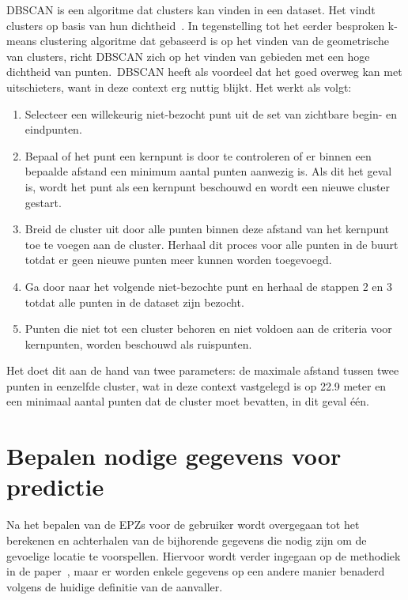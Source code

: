 \ac{DBSCAN} is een algoritme dat clusters kan vinden in een dataset. Het vindt
clusters op basis van hun dichtheid~\cite{KMeansvs80:online}. In tegenstelling tot het eerder besproken
k-means clustering algoritme dat gebaseerd is
op het vinden van de geometrische van clusters, richt \ac{DBSCAN}
zich op het vinden van gebieden met een hoge dichtheid van punten.\ \ac{DBSCAN}
heeft als voordeel dat het goed overweg kan met uitschieters, want in deze
context erg nuttig blijkt. Het werkt als volgt:
\begin{enumerate}
    \item Selecteer een willekeurig niet-bezocht punt uit de set van zichtbare begin- en
          eindpunten.
    \item Bepaal of het punt een kernpunt is door te controleren of er binnen een
          bepaalde afstand een minimum aantal punten aanwezig is. Als dit het geval is,
          wordt het punt als een kernpunt beschouwd en wordt een nieuwe cluster gestart.
    \item Breid de cluster uit door alle punten binnen deze afstand van het kernpunt toe
          te voegen aan de cluster. Herhaal dit proces voor alle punten in de buurt
          totdat er geen nieuwe punten meer kunnen worden toegevoegd.
    \item Ga door naar het volgende niet-bezochte punt en herhaal de stappen 2 en 3
          totdat alle punten in de dataset zijn bezocht.
    \item Punten die niet tot een cluster behoren en niet voldoen aan de criteria voor
          kernpunten, worden beschouwd als ruispunten.
\end{enumerate}
Het doet dit aan de hand van twee parameters: de maximale afstand tussen twee
punten in eenzelfde cluster, wat in deze context vastgelegd is op 22.9 meter en
een minimaal aantal punten dat de cluster moet bevatten, in dit geval één.

\section{Bepalen nodige gegevens voor predictie}
Na het bepalen van de \acp{EPZ} voor de gebruiker wordt overgegaan tot het
berekenen en achterhalen van de bijhorende gegevens die nodig zijn om de
gevoelige locatie te voorspellen. Hiervoor wordt verder ingegaan op de
methodiek in de paper~\citeauthor{Dhondt}, maar er worden enkele gegevens op
een andere manier benaderd volgens de huidige definitie van de aanvaller.

